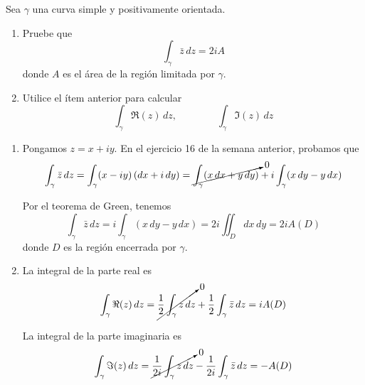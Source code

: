 \begin{exercise}
Sea $\gamma$ una curva simple y positivamente orientada.
\begin{enumerate}[label=(\alph*)]
    \item Pruebe que
    $$\int_\gamma \bar z \, dz = 2iA$$
    donde $A$ es el área de la región limitada por $\gamma$.
    
    \item Utilice el ítem anterior para calcular
    $$\int_\gamma \Re(z) \, dz, \qquad \qquad \int_\gamma \Im(z) \, dz$$
\end{enumerate}
\end{exercise}

\begin{solution}
\leavevmode
\begin{enumerate}[label=(\alph*)]
    \item Pongamos $z = x + iy$. En el ejercicio 16 de la semana anterior, probamos que
    $$
    \int_\gamma \bar z \, dz
        = \int_\gamma (x - iy) \, (dx + i \, dy)
        = \cancelto 0 {\int_\gamma (x \, dx + y \, dy)} + i \int_\gamma (x \, dy - y \, dx)
    $$
    
    Por el teorema de Green, tenemos
    $$
    \int_\gamma \bar z \, dz
        = i \int_\gamma (x \, dy - y \, dx)
        = 2i \iint_D dx \, dy
        = 2iA(D)
    $$
    donde $D$ es la región encerrada por $\gamma$.
    
    \item La integral de la parte real es
    $$
    \int_\gamma \Re(z) \, dz
        = \cancelto 0 {\frac 12 \int_\gamma z \, dz}
        + \frac 12 \int_\gamma \bar z \, dz
        = iA(D)
    $$
    
    La integral de la parte imaginaria es
    $$
    \int_\gamma \Im(z) \, dz
        = \cancelto 0 {\frac 1 {2i} \int_\gamma z \, dz}
        - \frac 1 {2i} \int_\gamma \bar z \, dz
        = -A(D)$$
\end{enumerate}
\end{solution}
